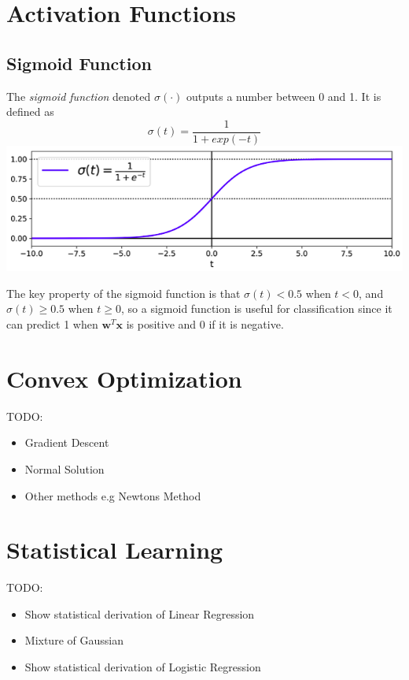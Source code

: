 \documentclass[12pt]{article}
\begin{document}
\section{Activation Functions}
    \subsection{Sigmoid Function}
        The \textit{sigmoid function} denoted $\sigma(\cdot)$ outputs a number between 0 and 1. It is defined as
        $$ \sigma(t) = \frac{1}{1 + exp(-t)} $$
        \includegraphics[scale=0.7]{sigmoid}

        The key property of the sigmoid function is that $\sigma(t) < 0.5$ when $t < 0$, and $\sigma(t) \geq 0.5$ when $t \geq 0$, so a sigmoid function is useful for classification since it can predict 1 when $\boldsymbol{w}^T\boldsymbol{x}$
        is positive and 0 if it is negative.

\section{Convex Optimization}
    TODO:
    \begin{itemize}
        \item Gradient Descent
        \item Normal Solution
        \item Other methods e.g Newtons Method
    \end{itemize}

\section{Statistical Learning}
    TODO:
    \begin{itemize}
        \item Show statistical derivation of Linear Regression
        \item Mixture of Gaussian
        \item Show statistical derivation of Logistic Regression
    \end{itemize}
\end{document}
